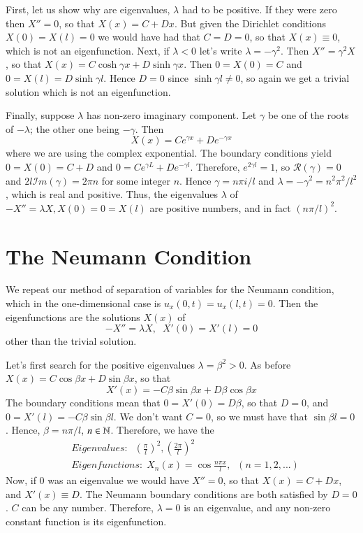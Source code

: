 First, let us show why are eigenvalues, $\lambda$ had to be positive. If they were zero then $X'' = 0$, so that $X(x) = C+Dx$. But given the Dirichlet conditions $X(0) = X(l) = 0$ we would have had that $C = D = 0$, so that $X(x) \equiv 0$, which is not an eigenfunction. Next, if $\lambda < 0$ let's write $\lambda = -\gamma^2$. Then $X''=\gamma^2X$, so that $X(x) = C\cosh\gamma x + D\sinh\gamma x$. Then $0 = X(0) = C$ and $0 = X(l) = D\sinh\gamma l$. Hence $D = 0$ since $\sinh\gamma l \neq 0$, so again we get a trivial solution which is not an eigenfunction.

Finally, suppose $\lambda$ has non-zero imaginary component. Let $\gamma$ be one of the roots of $-\lambda$; the other one being $-\gamma$. Then \begin{equation*}
    X(x) = Ce^{\gamma x} + De^{-\gamma x}
\end{equation*}
where we are using the complex exponential. The boundary conditions yield $0 = X(0) = C+D$ and $0 = Ce^{\gamma L} + De^{-\gamma l}$. Therefore, $e^{2\gamma l} = 1$, so $\mathscr{R}(\gamma) = 0$ and $2l\mathscr{I}m(\gamma) = 2\pi n$ for some integer $n$. Hence $\gamma = n\pi i /l$ and $\lambda = -\gamma^2 = n^2\pi^2/l^2$, which is real and positive. Thus, the eigenvalues $\lambda$ of $-X'' = \lambda X, X(0) = 0 = X(l)$ are positive numbers, and in fact $(n\pi/l)^2$.



\section{The Neumann Condition}

We repeat our method of separation of variables for the Neumann condition, which in the one-dimensional case is $u_x(0,t) = u_x(l,t)=0$. Then the eigenfunctions are the solutions $X(x)$ of \begin{equation}
    -X''=\lambda X,\;\;X'(0) = X'(l) = 0
\end{equation}
other than the trivial solution. 

Let's first search for the positive eigenvalues $\lambda = \beta^2 > 0$. As before $X(x) = C\cos\beta x + D\sin \beta x$, so that \begin{equation*}
    X'(x) = -C\beta\sin\beta x+ D\beta \cos\beta x
\end{equation*}
The boundary conditions mean that $0 = X'(0) = D\beta$, so that $D=0$, and $0 = X'(l) = -C\beta \sin\beta l$. We don't want $C = 0$, so we must have that $\sin \beta l = 0$. Hence, $\beta = n\pi/l$, $n \in \mathbb N$. Therefore, we have the \begin{align}
    &Eigenvalues:\;\;\left(\frac{\pi}{l}\right)^2,\left(\frac{2\pi}{l}\right)^2 \\
    &Eigenfunctions: \;X_n(x) = \cos\frac{n\pi x}{l},\;\;(n=1,2,...)
\end{align}
Now, if $0$ was an eigenvalue we would have $X'' = 0$, so that $X(x) = C+Dx$, and $X'(x) \equiv D$. The Neumann boundary conditions are both satisfied by $D = 0$. $C$ can be any number. Therefore, $\lambda = 0$ is an eigenvalue, and any non-zero constant function is its eigenfunction.

